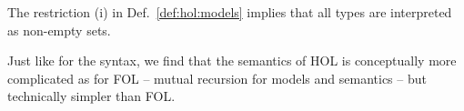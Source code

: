 \begin{remark}
The restriction (i) in Def.~\ref{def:hol:models} implies that all types are interpreted as non-empty sets.
\end{remark}

\begin{remark}
Just like for the syntax, we find that the semantics of HOL is conceptually more complicated as for FOL -- mutual recursion for models and semantics -- but technically simpler than FOL.
\end{remark}